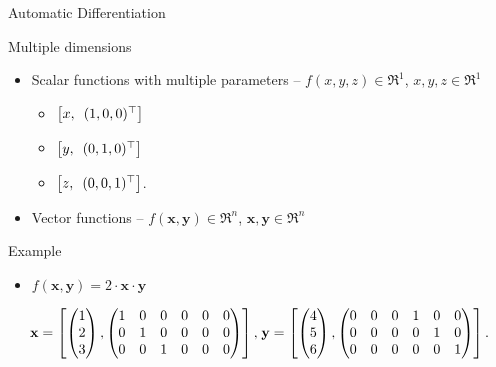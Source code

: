 \begin{frame}{Automatic Differentiation}
    \begin{block}{Multiple dimensions}
        \begin{itemize}
            \item Scalar functions with multiple parameters -- $f(x,y,z)\in\Re^1$, $x,y,z\in\Re^1$
            \begin{itemize}
                \item $\left[x,\hspace{0.5em}(1,0,0)^\top\right]$
                \item $\left[y,\hspace{0.5em}(0,1,0)^\top\right]$
                \item $\left[z,\hspace{0.5em}(0,0,1)^\top\right]$.
            \end{itemize}
            \pause
            \item Vector functions -- $f(\textbf{x},\textbf{y})\in\Re^n$, $\textbf{x},\textbf{y}\in\Re^n$
        \end{itemize}
    \end{block}
    \pause
    \begin{block}{Example}
        \begin{itemize}
            \item $f(\textbf{x},\textbf{y}) = 2\cdot\textbf{x}\cdot\textbf{y}$
        \end{itemize}
        \pause
        \begin{equation*}
            \textbf{x} = \left[\begin{pmatrix}1\\2\\3
            \end{pmatrix},\begin{pmatrix}
            1&0&0&0&0&0\\
            0&1&0&0&0&0\\
            0&0&1&0&0&0\end{pmatrix} \right],
            \hspace{0.1em}
            \textbf{y}=\left[\begin{pmatrix}4\\5\\6
            \end{pmatrix},\begin{pmatrix}
            0&0&0&1&0&0\\
            0&0&0&0&1&0\\
            0&0&0&0&0&1\end{pmatrix} \right].
        \end{equation*}
    \end{block}
\end{frame}
